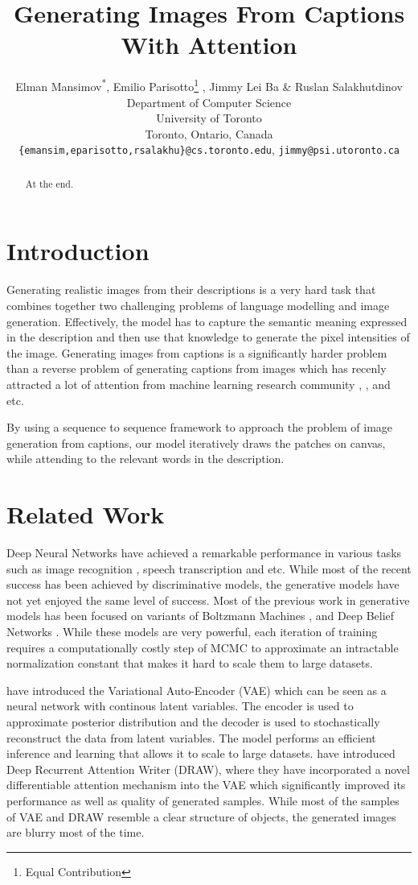 \documentclass{article} %
\title{Generating Images From Captions\\ With Attention}
\author{
Elman Mansimov\textsuperscript{*}, Emilio Parisotto\thanks{Equal Contribution} , Jimmy Lei Ba \& Ruslan Salakhutdinov\\
Department of Computer Science\\
University of Toronto\\
Toronto, Ontario, Canada \\
\texttt{\{emansim,eparisotto,rsalakhu\}@cs.toronto.edu}, \texttt{jimmy@psi.utoronto.ca}
}
\begin{document}
\maketitle

\begin{abstract}
At the end.
\end{abstract}

\section{Introduction}

Generating realistic images from their descriptions is a very hard task that combines together two challenging problems of language modelling and image generation. Effectively, the model has to capture the semantic meaning expressed in the description and then use that knowledge to generate the pixel intensities of the image. Generating images from captions is a significantly harder problem than a reverse problem of generating captions from images which has recenly attracted a lot of attention from machine learning research community \citep{karpathy_captions}, \citep{xu_captions}, \citep{kiros_captions} and etc. 

By using a sequence to sequence framework to approach the problem of image generation from captions, our model iteratively draws the patches on canvas, while attending to the relevant words in the description.


\section{Related Work}

Deep Neural Networks have achieved a remarkable performance in various tasks such as image recognition \citep{krizhevsky_imagenet}, speech transcription \citep{graves_speech} and etc. While most of the recent success has been achieved by discriminative models, the generative models have not yet enjoyed the same level of success. Most of the previous work in generative models has been focused on variants of Boltzmann Machines \citep{smolensky_rbm}, \citep{russ_dbm} and Deep Belief Networks \citep{hinton_dbn}. While these models are very powerful, each iteration of training requires a computationally costly step of MCMC to approximate an intractable normalization constant that makes it hard to scale them to large datasets.

\cite{kingma_vae} have introduced the Variational Auto-Encoder (VAE) which can be seen as a neural network with continous latent variables. The encoder is used to approximate posterior distribution and the decoder is used to stochastically reconstruct the data from latent variables. The model performs an efficient inference and learning that allows it to scale to large datasets. \cite{gregor_draw} have introduced Deep Recurrent Attention Writer (DRAW), where they have incorporated a novel differentiable attention mechanism into the VAE which significantly improved its performance as well as quality of generated samples. While most of the samples of VAE and DRAW resemble a clear structure of objects, the generated images are blurry most of the time.
\end{document}
